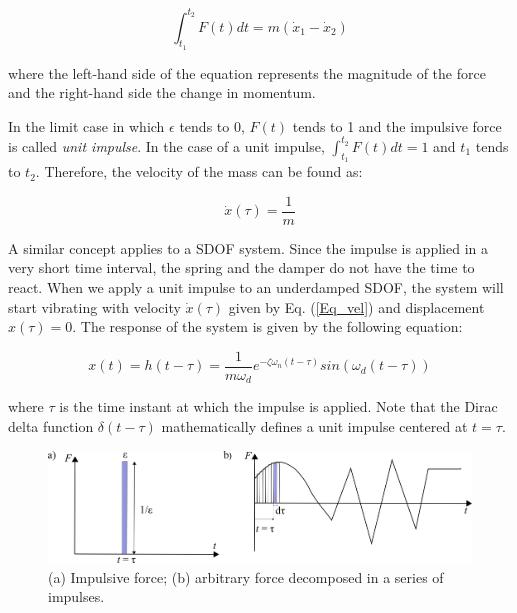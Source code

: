 \documentclass[12pt,letter]{article}
\numberwithin{ex}{section} %
\numberwithin{re}{section} %
\begin{document}
\begin{equation}
\int_{t_1}^{t_2} F(t) dt = m (\dot{x}_1 - \dot{x}_2)
\end{equation}

where the left-hand side of the equation represents the magnitude of the force and the right-hand side the change in momentum. 

In the limit case in which $\epsilon$ tends to 0, $F(t)$ tends to 1 and the impulsive force is called \emph{unit impulse}. In the case of a unit impulse, $\int_{t_1}^{t_2} F(t) dt = 1$ and $t_1$ tends to $t_2$. Therefore, the velocity of the mass can be found as:

\begin{equation} \label{Eq_vel}
\dot{x}(\tau)=\frac{1}{m}
\end{equation}

A similar concept applies to a SDOF system. Since the impulse is applied in a very short time interval, the spring and the damper do not have the time to react. When we apply a unit impulse to an underdamped SDOF, the system will start vibrating with velocity $\dot{x}(\tau)$ given by Eq. (\ref{Eq_vel}) and displacement $x(\tau) = 0$. The response of the system is given by the following equation:


\begin{equation}
x(t) = h(t - \tau) = \frac{1}{m \omega_d} e^{-\zeta \omega_n (t - \tau)} sin(\omega_d (t - \tau))
\end{equation}

where $\tau$ is the time instant at which the impulse is applied. Note that the Dirac delta function $\delta(t - \tau)$ mathematically defines a unit impulse centered at $t = \tau$.

\vspace{2ex}


\begin{figure}[H]
	\centering
	\includegraphics{../figures/Structural_Impulse.png}
	\caption{(a) Impulsive force; (b) arbitrary force decomposed in a series of impulses.}
	\label{fig:impulsive_force}
\end{figure}
\end{document}
